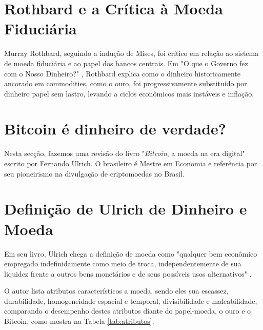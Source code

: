 \section*{Rothbard e a Crítica à Moeda Fiduciária}
Murray Rothbard, seguindo a indução de Mises, foi crítico em relação ao sistema de moeda fiduciária e ao papel dos bancos centrais. Em "O que o Governo fez com o Nosso Dinheiro?" \cite{rothbard2022governo}, Rothbard explica como o dinheiro historicamente ancorado em commodities, como o ouro, foi progressivamente substituído por dinheiro papel sem lastro, levando a ciclos econômicos mais instáveis e inflação.

\section{Bitcoin é dinheiro de verdade?} \label{sec:dinheiro}
Nesta secção, fazemos uma revisão do livro "\textit{Bitcoin}, a moeda na era digital"\cite{Ulrich2014} escrito por Fernando Ulrich. O brasileiro é Mestre em Economia e referência por seu pioneirismo na divulgação de criptomoedas no Brasil.

\section*{Definição de Ulrich de Dinheiro e Moeda}
Em seu livro, Ulrich chega a definição de moeda como "qualquer bem econômico empregado indefinidamente como meio de troca, independentemente de sua liquidez frente a outros bens monetários e de seus possíveis usos alternativos" \cite[P.89]{Ulrich2014}.

O autor lista atributos característicos a moeda, sendo eles sua escassez,
durabilidade, homogeneidade espacial e temporal, divisibilidade e maleabilidade, comparando o desempenho destes atributos diante do papel-moeda, o ouro e o Bitcoin, como mostra na Tabela \ref*{tab:atributos}.

